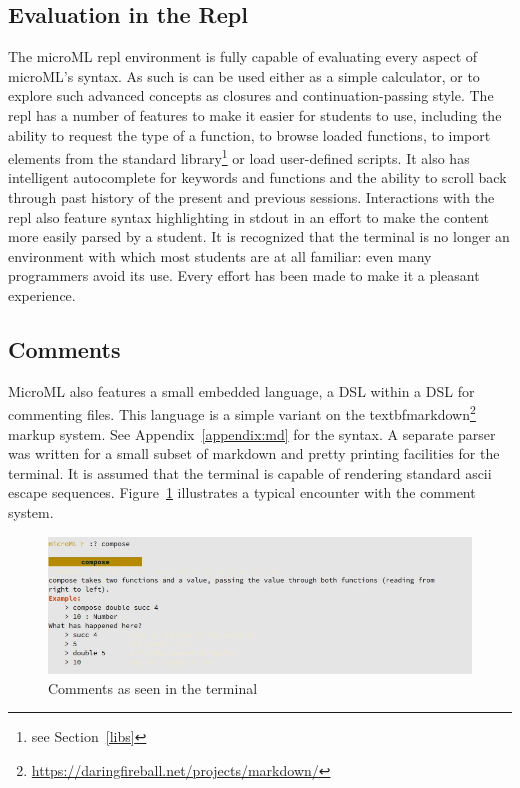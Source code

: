 \documentclass[12pt, a4paper]{report}
\begin{document}
\subsection{Evaluation in the Repl}
The microML repl environment is fully capable of evaluating every aspect of microML's syntax. As
such is can be used either as a simple calculator, or to explore such advanced concepts as closures
and continuation-passing style. The repl has a number of features to make it easier for students to
use, including the ability to request the type of a function, to browse loaded functions, to import
elements from the standard library\footnote{see Section~\ref{libs}} or load user-defined scripts.
It also has intelligent autocomplete for keywords and functions and the ability to scroll back
through past history of the present and previous sessions. Interactions with the repl also feature
syntax highlighting in stdout in an effort to make the content more easily parsed by a student. It
is recognized that the terminal is no longer an environment with which most students are at all
familiar: even many programmers avoid its use. Every effort has been made to make it a pleasant
experience.

\subsection{Comments} MicroML also features a small embedded language, a DSL
within a DSL for commenting files. This language is a simple variant on the
textbf{markdown}\footnote{\url{https://daringfireball.net/projects/markdown/}} markup system. See
Appendix~\ref{appendix:md} for the syntax. A separate parser was written for a small subset of
markdown and pretty printing facilities for the terminal. It is assumed that the terminal is capable
of rendering standard ascii escape sequences. Figure~\ref{fig:comments} illustrates a typical
encounter with the comment system.

\begin{figure}
    \includegraphics[width=\textwidth]{images/comment.jpg}
    {\caption{Comments as seen in the terminal}}
\label{fig:comments}
\end{figure}
\end{document}
